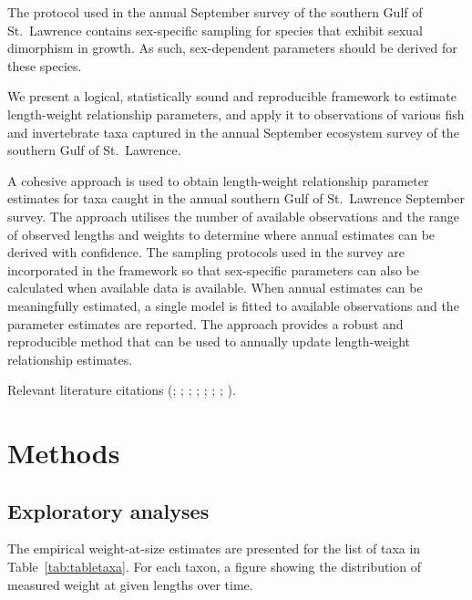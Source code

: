 \documentclass[12pt]{article}\usepackage[]{graphicx}\usepackage[]{color}
\begin{document}
The protocol used in the annual September survey of the southern Gulf of St.~Lawrence contains sex-specific sampling for species that exhibit sexual dimorphism in growth. As such, sex-dependent parameters should be derived for these species.

We present a logical, statistically sound and reproducible framework to estimate length-weight relationship parameters, and apply it to observations of various fish and invertebrate taxa captured in the annual September ecosystem survey of the southern Gulf of St.~Lawrence.

A cohesive approach is used to obtain length-weight relationship parameter estimates for taxa caught in the annual southern Gulf of St.~Lawrence September survey. The approach utilises the number of available observations and the range of observed lengths and weights to determine where annual estimates can be derived with confidence. The sampling protocols used in the survey are incorporated in the framework so that sex-specific parameters can also be calculated when available data is available. When annual estimates can be meaningfully estimated, a single model is fitted to available observations and the parameter estimates are reported. The approach provides a robust and reproducible method that can be used to annually update length-weight relationship estimates.

Relevant literature citations (; ; ; ; ; ; ; ).

\section{Methods}\label{methods}

\subsection{Exploratory analyses}\label{exploratory-analyses}

The empirical weight-at-size estimates are presented for the list of taxa in Table~\ref{tab:tabletaxa}. For each taxon, a figure showing the distribution of measured weight at given lengths over time.
\end{document}
